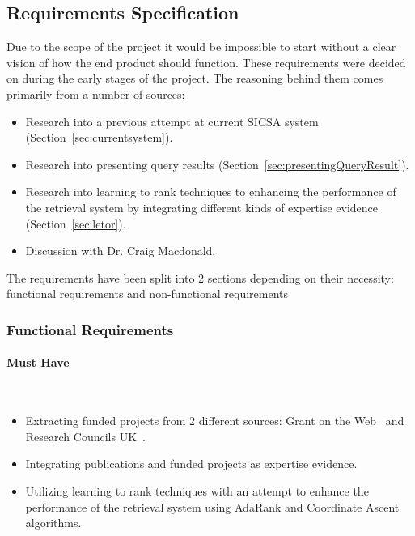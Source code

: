 \subsection{Requirements Specification}\label{sec:requirements}
Due to the scope of the project it would be impossible to start without a clear vision of how
the end product should function. These requirements were decided on during the early stages of the project. 
The reasoning behind them comes primarily from a number of sources:
\begin{itemize}
 \item Research into a previous attempt at current SICSA system (Section~\ref{sec:currentsystem}).
 \item Research into presenting query results (Section~\ref{sec:presentingQueryResult}).
 \item Research into learning to rank techniques to enhancing the performance of the retrieval system by integrating different kinds of 
 expertise evidence (Section~\ref{sec:letor}).
 \item Discussion with Dr. Craig Macdonald.
\end{itemize}
The requirements have been split into 2 sections depending on their necessity: functional requirements and non-functional requirements

\subsubsection{Functional Requirements}
\paragraph{Must Have} \hspace{0pt} \\
\begin{itemize}
 \item Extracting funded projects from 2 different sources: Grant on the Web~\cite{gow} and Research Councils UK~\cite{gtr}.
 \item Integrating publications and funded projects as expertise evidence.
 \item Utilizing learning to rank techniques with an attempt to enhance the performance of the retrieval system using AdaRank and Coordinate Ascent algorithms.
\end{itemize}

